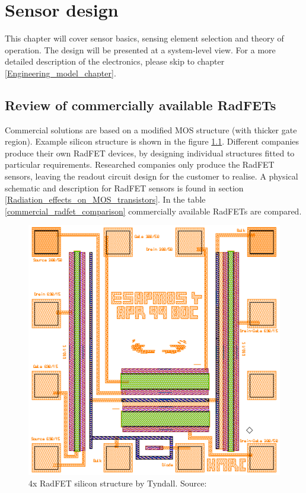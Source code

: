 \chapter{Sensor design}
This chapter will cover sensor basics, sensing element selection and theory of operation. The design will be presented at a system-level view. For a more detailed description of the electronics, please skip to chapter \ref{Engineering_model_chapter}.

\section{Review of commercially available RadFETs}
    Commercial solutions are based on a modified MOS structure (with thicker gate region). Example silicon structure is shown in the figure \ref{Tyndall_radfet_silicon}. Different companies produce their own RadFET devices, by designing individual structures fitted to particular requirements. Researched companies only produce the RadFET sensors, leaving the readout circuit design for the customer to realise. A physical schematic and description for RadFET sensors is found in section \ref{Radiation_effects_on_MOS_transistors}. In the table \ref{commercial_radfet_comparison} commercially available RadFETs are compared.

    \begin{figure}[H]
        \centering
        \includegraphics[width=0.45\paperwidth]{img/05/radfet-silicon.eps}
        \caption{4x RadFET silicon structure by Tyndall. Source: \cite{Tyndall_Radfet}}
        \label{Tyndall_radfet_silicon}
    \end{figure}

